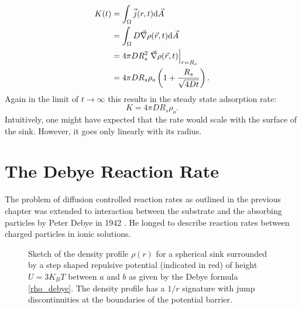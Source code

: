 \begin{align}
    K(t) &= \int_\Omega \vec j(r,t) {\rm d} \vec A \nonumber \\
    &= \int_\Omega D  \vec{\nabla} \rho(\vec{r},t) {\rm d} \vec{A} \nonumber \\
    &= 4 \pi D R_s^2 \left. \vec{\nabla} \rho(\vec{r},t) \right|_{r = R_s} \nonumber \\
    &= 4 \pi D R_s \rho_o \left( 1 + \frac{R_s}{\sqrt{4Dt}} \right).
    \label{ideal reaction rate}
\end{align}
Again in the limit of $t \rightarrow \infty$ this results in the steady state adsorption rate:
\begin{equation}
    \boxed{K = 4 \pi D R_s \rho_o.}
    \label{steady state ideal rate}
\end{equation}
Intuitively, one might have expected that the rate would scale with the surface of the sink. However, it goes only linearly with its radius.
\section{The Debye Reaction Rate}
\label{The_Debye_Reaction_Rate}
The problem of diffusion controlled reaction rates as outlined in the previous chapter was extended to interaction between the substrate and the absorbing particles by Peter Debye in 1942 \cite{Debye1942}. He longed to describe reaction rates between charged particles in ionic solutions. \\
\vspace{- .5 cm} \par

\begin{minipage}[t]{0.38 \textwidth}
    \begin{figure}[H]
        \caption{Sketch of the density profile $\rho(r)$ for a spherical sink surrounded by a step shaped repulsive potential (indicated in red) of height $U = 3 K_B T$ between $a$ and $b$ as given by the Debye formula \eqref{rho_debye}. The density profile has a $1/r$ signature with jump discontinuities at the boundaries of the potential barrier. \label{fig:rho_debye}}
    \end{figure}
\end{minipage}\begin{minipage}[t]{0.62 \textwidth}
    \begin{figure}[H]
         
    \end{figure}
\end{minipage}
\vspace{.3 cm}\\


